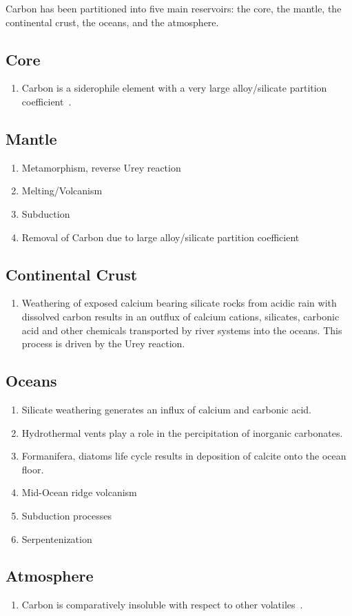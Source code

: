 Carbon has been partitioned into five main reservoirs: the core, the mantle, the continental crust, the oceans, and the atmosphere.

\subsection{Core}
	\begin{enumerate}
		\item Carbon is a siderophile element with a very large alloy/silicate partition coefficient~\cite{DR-CH-SN:2013}.
	\end{enumerate}
\subsection{Mantle}
	\begin{enumerate}
		\item Metamorphism, reverse Urey reaction
		\item Melting/Volcanism
		\item Subduction
		\item Removal of Carbon due to large alloy/silicate partition coefficient
	\end{enumerate}
\subsection{Continental Crust}
	\begin{enumerate}
		\item Weathering of exposed calcium bearing silicate rocks from acidic rain with dissolved carbon results in an outflux of calcium cations, silicates, carbonic acid and other chemicals transported by river systems into the oceans. This process is driven by the Urey reaction.
	\end{enumerate}
\subsection{Oceans}
	\begin{enumerate}
		\item Silicate weathering generates an influx of calcium and carbonic acid.
		\item Hydrothermal vents play a role in the percipitation of inorganic carbonates.
		\item Formanifera, diatoms life cycle results in deposition of calcite onto the ocean floor.
		\item Mid-Ocean ridge volcanism
		\item Subduction processes
		\item Serpentenization
	\end{enumerate}
\subsection{Atmosphere}
	\begin{enumerate}
		\item Carbon is comparatively insoluble with respect to other volatiles~\cite{HMM:2016}.
	\end{enumerate}